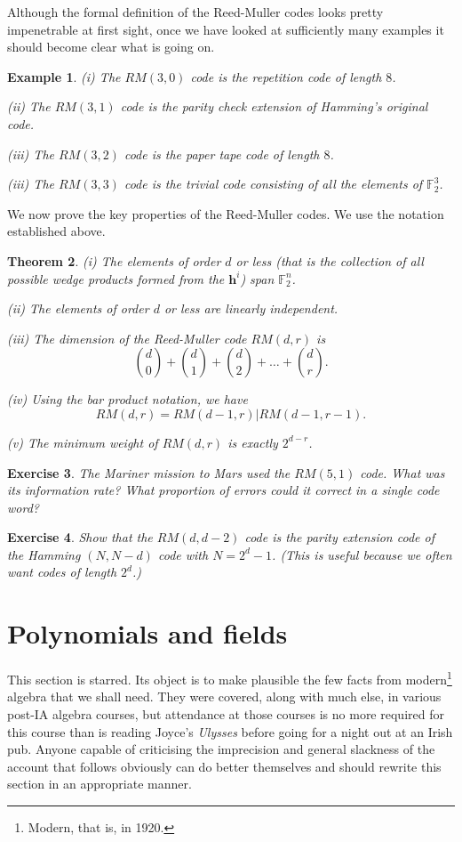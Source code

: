 \documentclass[12pt,a4paper]{article}
\theoremstyle{plain}
\newtheorem{theorem}{Theorem}[section]
\newtheorem{example}[theorem]{Example}
\newtheorem{exercise}[theorem]{Exercise}
\theoremstyle{definition}
\begin{document}
    Although the formal definition of the Reed-Muller codes
    looks pretty impenetrable at first sight, once
    we have looked at sufficiently many examples
    it should become clear what is going on.
    \begin{example}
        (i) The $RM(3,0)$ code is the repetition
        code of length $8$.

        (ii) The $RM(3,1)$ code is the parity check
        extension of Hamming's original code.

        (iii) The $RM(3,2)$ code is the paper tape code
        of length $8$.

        (iii) The $RM(3,3)$ code is the trivial code
        consisting of all the elements of
        ${\mathbb F}^{3}_{2}$.
    \end{example}

    We now prove the key properties of the Reed-Muller
    codes. We use the notation established above.
    \begin{theorem}
        \label{theorem Reed}
        (i) The elements of order $d$
        or less (that is the collection of all possible wedge products
        formed from the ${\mathbf h}^{i}$) span
        ${\mathbb F}^{n}_{2}$.

        (ii) The elements of order $d$
        or less are linearly independent.

        (iii) The dimension of the Reed-Muller code $RM(d,r)$
        is
        \[\binom{d}{0}+\binom{d}{1}+\binom{d}{2}
        +\dots+\binom{d}{r}.\]

        (iv) Using the bar product notation, we
        have
        \[RM(d,r)=RM(d-1,r)|RM(d-1,r-1).\]

        (v) The minimum weight of $RM(d,r)$ is exactly
        $2^{d-r}$.
    \end{theorem}
    \begin{exercise}
        The Mariner mission to Mars used
        the $RM(5,1)$ code. What was its information
        rate? What proportion of errors could it correct
        in a single code word?
    \end{exercise}
    \begin{exercise}
        Show that the $RM(d,d-2)$ code is the
        parity extension code of the Hamming $(N,N-d)$ code
        with $N=2^{d}-1$. (This is useful because we often
        want codes of length $2^{d}$.)
    \end{exercise}
    \section{Polynomials and fields} This section is
    starred. Its
    object is to make plausible the few facts from
    modern\footnote{Modern, that is, in 1920.} algebra
    that we shall need. They were covered, along with
    much else, in various post-IA algebra courses,
    but attendance at those courses is no more
    required for this course than is reading Joyce's
    \emph{Ulysses} before going for a night out at
    an Irish pub. Anyone capable of criticising
    the imprecision and general slackness of the
    account that follows obviously can do better
    themselves and should rewrite this section in an appropriate
    manner.
\end{document}

